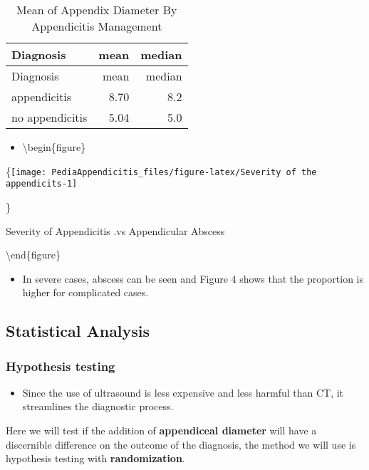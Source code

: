 \documentclass[
]{article}
\providecommand{\tightlist}{%
  \setlength{\itemsep}{0pt}\setlength{\parskip}{0pt}}
\begin{document}
\begin{longtable}[]{@{}lrr@{}}
\caption{Mean of Appendix Diameter By Appendicitis
Management}\tabularnewline
\toprule\noalign{}
Diagnosis & mean & median \\
\midrule\noalign{}
\endfirsthead
\toprule\noalign{}
Diagnosis & mean & median \\
\midrule\noalign{}
\endhead
\bottomrule\noalign{}
\endlastfoot
appendicitis & 8.70 & 8.2 \\
no appendicitis & 5.04 & 5.0 \\
\end{longtable}

\begin{itemize}
\tightlist
\item
  \textbackslash begin\{figure\}
\end{itemize}

\{\centering \texttt{[image: PediaAppendicitis\_files/figure-latex/Severity of the appendicits-1]}

\}

\caption{Severity of Appendicitis .vs Appendicular Abscess  }\label{fig:Severity of the appendicits}

\textbackslash end\{figure\}

\begin{itemize}
\tightlist
\item
  In severe cases, abscess can be seen and Figure 4 shows that the
  proportion is higher for complicated cases.
\end{itemize}

\subsection{Statistical Analysis}\label{statistical-analysis}

\subsubsection{Hypothesis testing}\label{hypothesis-testing}

\begin{itemize}
\tightlist
\item
  Since the use of ultrasound is less expensive and less harmful than
  CT, it streamlines the diagnostic process.
\end{itemize}

Here we will test if the addition of \textbf{appendiceal diameter} will
have a discernible difference on the outcome of the diagnosis, the
method we will use is hypothesis testing with \textbf{randomization}.
\end{document}
